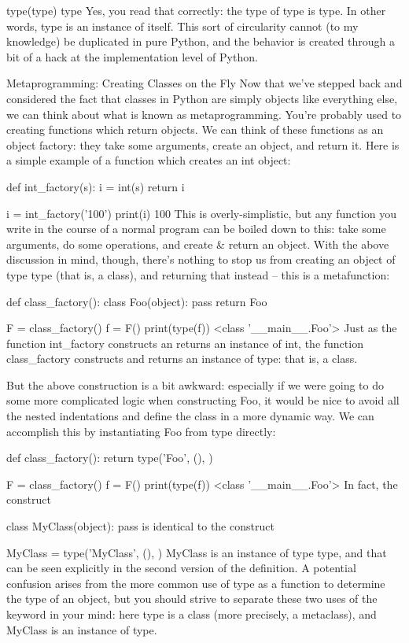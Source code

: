type(type)
type
Yes, you read that correctly: the type of type is type. In other words, type is an instance of itself. This sort of circularity cannot (to my knowledge) be duplicated in pure Python, and the behavior is created through a bit of a hack at the implementation level of Python.

Metaprogramming: Creating Classes on the Fly
Now that we've stepped back and considered the fact that classes in Python are simply objects like everything else, we can think about what is known as metaprogramming. You're probably used to creating functions which return objects. We can think of these functions as an object factory: they take some arguments, create an object, and return it. Here is a simple example of a function which creates an int object:

def int_factory(s):
    i = int(s)
    return i

i = int_factory('100')
print(i)
100
This is overly-simplistic, but any function you write in the course of a normal program can be boiled down to this: take some arguments, do some operations, and create & return an object. With the above discussion in mind, though, there's nothing to stop us from creating an object of type type (that is, a class), and returning that instead -- this is a metafunction:

def class_factory():
    class Foo(object):
        pass
    return Foo

F = class_factory()
f = F()
print(type(f))
<class '__main__.Foo'>
Just as the function int_factory constructs an returns an instance of int, the function class_factory constructs and returns an instance of type: that is, a class.

But the above construction is a bit awkward: especially if we were going to do some more complicated logic when constructing Foo, it would be nice to avoid all the nested indentations and define the class in a more dynamic way. We can accomplish this by instantiating Foo from type directly:

def class_factory():
    return type('Foo', (), {})

F = class_factory()
f = F()
print(type(f))
<class '__main__.Foo'>
In fact, the construct

class MyClass(object):
    pass
is identical to the construct

MyClass = type('MyClass', (), {})
MyClass is an instance of type type, and that can be seen explicitly in the second version of the definition. A potential confusion arises from the more common use of type as a function to determine the type of an object, but you should strive to separate these two uses of the keyword in your mind: here type is a class (more precisely, a metaclass), and MyClass is an instance of type.

